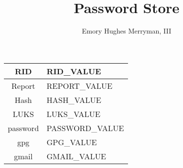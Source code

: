 \documentclass{article}
\begin{document}
\title{Password Store}
\author{Emory Hughes Merryman, III}
\maketitle
\begin{tabular}{||c|p{10cm}||}
  \hline
  RID & RID_VALUE \\ \hline
  Report & REPORT_VALUE \\ \hline
  Hash & HASH_VALUE \\ \hline
  LUKS & LUKS_VALUE \\ \hline
  password & PASSWORD_VALUE \\ \hline
  gpg & GPG_VALUE \\ \hline
  gmail & GMAIL_VALUE \\ \hline
  \hline
\end{tabular}
\end{document}
